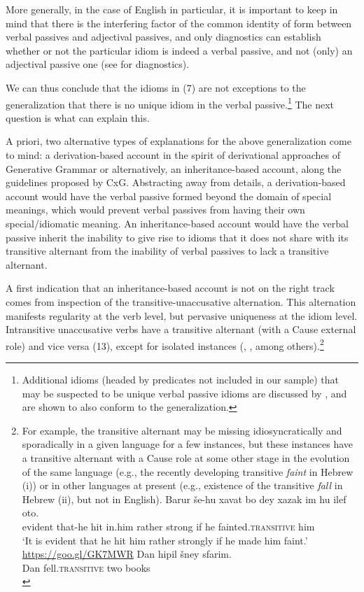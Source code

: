 \documentclass[output=paper,
modfonts
]{LSP/langsci}
\begin{document}
More generally, in the case of English in particular, it is important to
keep in mind that there is the interfering factor of the common identity
of form between verbal passives and adjectival passives, and only
diagnostics can establish whether or not the particular idiom is indeed
a verbal passive, and not (only) an adjectival passive one (see \citealt{wasow1977} for diagnostics).

We can thus conclude that the idioms in (7) are not exceptions to the
generalization that there is no unique idiom in the verbal
passive.\footnote{Additional idioms (headed by predicates not included
  in our sample) that may be suspected to be unique verbal passive
  idioms are discussed by \citet{horvath2016}, and are shown to
  also conform to the generalization.} The next question is what can
explain this.

A priori, two alternative types of explanations for the above
generalization come to mind: a derivation-based account in the spirit of
derivational approaches of Generative Grammar or alternatively, an
inheritance-based account, along the guidelines proposed by CxG.
Abstracting away from details, a derivation-based account would have the
verbal passive formed beyond the domain of special meanings, which would
prevent verbal passives from having their own special/idiomatic meaning.
An inheritance-based account would have the verbal passive inherit the
inability to give rise to idioms that it does not share with its
transitive alternant from the inability of verbal passives to lack a
transitive alternant.

A first indication that an inheritance-based account is not on the right
track comes from inspection of the transitive-unaccusative alternation.
This alternation manifests regularity at the verb level, but pervasive
uniqueness at the idiom level. Intransitive unaccusative verbs have a
transitive alternant (with a Cause external role) and vice versa (13),
except for isolated instances (\citealt{haertl2003}, \citealt{reinhart2002}, among
others).\footnote{For example, the transitive alternant may be missing
idiosyncratically and sporadically in a given language for a few
instances, but these instances have a transitive alternant with a
Cause role at some other stage in the evolution of the same language
(e.g., the recently developing transitive \emph{faint} in Hebrew (i))
or in other languages at present (e.g., existence of the transitive
\emph{fall} in Hebrew (ii), but not in English).
\ea
\gll Barur še-hu xavat bo dey xazak im hu ilef oto.\\
	evident that-he hit in.him rather strong if he fainted.\textsc{transitive} him\\
	\glt `It is evident that he hit him rather strongly if he made him faint.'\\
	\hfill \url{https://goo.gl/GK7MWR}
\ex \gll Dan hipil šney sfarim.\\
	Dan fell.\textsc{transitive} two books\\
\z
}
\end{document}

